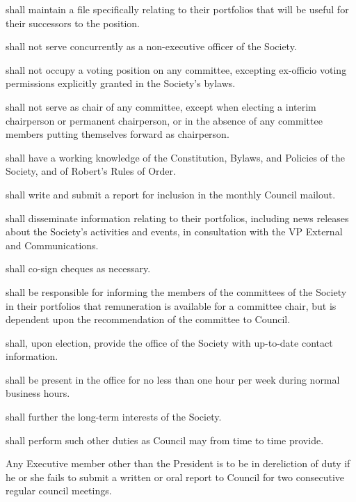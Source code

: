 \begin{longenum}[ label*=\thesection.\arabic*., align=left]
    \item shall maintain a file specifically relating to their portfolios that will be useful for their successors to the position.
    \item shall not serve concurrently as a non-executive officer of the Society.
    \item shall not occupy a voting position on any committee, excepting ex-officio voting permissions explicitly granted in the Society's bylaws.
    \begin{longenum}[ label*=\arabic*., align=left]
		\item shall not serve as chair of any committee, except when electing a interim chairperson or permanent chairperson, or in the absence of any committee members putting themselves forward as chairperson. 
   	\end{longenum}
    \item shall have a working knowledge of the Constitution, Bylaws, and Policies of the Society, and of Robert's Rules of Order.
    \item shall write and submit a report for inclusion in the monthly Council mailout.
    \item shall disseminate information relating to their portfolios, including news releases about the Society's activities and events, in consultation with the VP External and Communications.
    \item shall co-sign cheques as necessary.  
    \item shall be responsible for informing the members of the committees of the Society in their portfolios that remuneration is available for a committee chair, but is dependent upon the recommendation of the committee to Council.
    \item shall, upon election, provide the office of the Society with up-to-date contact information. 
    \item shall be present in the office for no less than one hour per week during normal business hours.
    \item shall further the long-term interests of the Society.
    \item shall perform such other duties as Council may from time to time provide.
    \item Any Executive member other than the President is to be in dereliction of duty if he or she fails to submit a written or oral report to Council for two consecutive regular council meetings.
\end{longenum}
